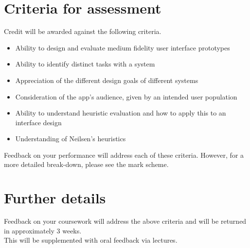 \documentclass[11pt,a4paper]{report}
\begin{document}
\section*{Criteria for assessment}
Credit will be awarded against the following criteria.
\begin{itemize}
    \item Ability to design and evaluate medium fidelity user interface prototypes
    \item Ability to identify distinct tasks with a system
    \item Appreciation of the different design goals of different systems
    \item Consideration of the app's audience, given by an intended user population
    \item Ability to understand heuristic evaluation and how to apply this to an interface design
    \item Understanding of Neilsen's heuristics
\end{itemize}
Feedback on your performance will address each of these criteria. However, for a more detailed break-down, please see the mark scheme.

\section*{Further details}
Feedback on your coursework will address the above criteria and will be returned in approximately 3 weeks.\\
This will be supplemented with oral feedback via lectures.
\end{document}
